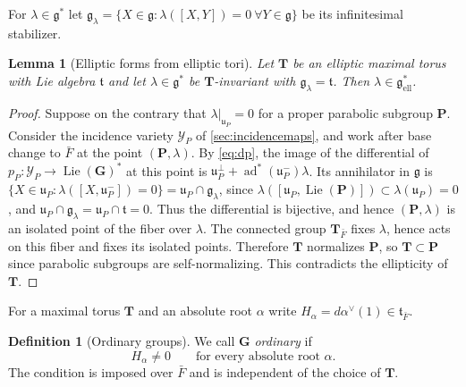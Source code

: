 \documentclass[11pt,reqno]{amsart}
\numberwithin{equation}{section}
\theoremstyle{plain}
\newtheorem{lemma}[theorem]{Lemma}
\theoremstyle{definition}
\newtheorem{definition}[theorem]{Definition}
\theoremstyle{remark}
\theoremstyle{plain}
\newcommand{\bG}{\mathbf{G}}     %
\newcommand{\bP}{\mathbf{P}}     %
\newcommand{\bT}{\mathbf{T}}     %
\newcommand{\g}{\mathfrak{g}}    %
\newcommand{\gd}{\mathfrak{g}^*} %
\newcommand{\uu}{\mathfrak{u}}   %
\newcommand{\liet}{\mathfrak{t}}  %
\newcommand{\Ell}[2][]{#2_{#1\mathrm{ell}}}   %
\DeclareMathOperator{\ad}{ad}
\DeclareMathOperator{\Lie}{Lie}
\newcommand{\ordinary}{ordinary}
\newcommand{\Ordinary}{Ordinary}
\newcommand{\lf}{\lambda}
\newcommand{\Inc}{\mathcal{Y}}
\newcommand{\bInc}{\boldsymbol{\Inc}}
\begin{document}
For $\lf\in\gd$ let $\g_\lf=\{X\in\g:\lf([X,Y])=0\ \forall Y\in\g\}$ be its infinitesimal stabilizer. 

\begin{lemma}[Elliptic forms from elliptic tori]\label{lem:toral}
Let $\bT$ be an elliptic maximal torus with Lie algebra $\liet$ and let
$\lf\in\gd$ be $\bT$-invariant with $\g_\lf=\liet$. Then $\lf\in\Ell{\gd}$.
\end{lemma}

\begin{proof}
Suppose on the contrary that $\lf|_{\uu_P}=0$ for a proper parabolic subgroup $\bP$.
Consider the incidence variety $\bInc_P$ of \cref{sec:incidencemaps},
and work after base change to $\bar F$
at the point $(\bP,\lf)$. By \eqref{eq:dp}, the
image of the differential of $p_P:\bInc_P\to\Lie(\bG)^*$ at this point is
$\uu_P^\perp+\ad^*(\uu_P^-)\lf$. Its annihilator in $\g$ is
$\{X\in\uu_P:\lf([X,\uu_P^-])=0\}=\uu_P\cap\g_\lf$, since
$\lf([\uu_P,\Lie(\bP)])\subset\lf(\uu_P)=0$, and
$\uu_P\cap\g_\lf=\uu_P\cap\liet=0$. Thus the differential is bijective, and hence $(\bP,\lf)$ is an
isolated point of the fiber over $\lf$. The connected group
$\bT_{\bar F}$ fixes $\lf$, hence acts on this fiber and fixes its
isolated points. Therefore $\bT$ normalizes $\bP$, so $\bT\subset\bP$
since parabolic subgroups are self-normalizing. This contradicts the ellipticity of $\bT$.
\end{proof}

For a maximal torus $\bT$ and an absolute root $\alpha$ write
$H_\alpha=d\alpha^\vee(1)\in\liet_{\bar F}$.

\begin{definition}[\Ordinary{} groups]\label{def:ordinary}
We call $\bG$ \emph{\ordinary{}} if
\begin{equation}\label{eq:corootcondition}
H_\alpha\ne0\qquad\text{for every absolute root }\alpha.
\end{equation}
The condition is imposed over $\bar F$ and is independent of the
choice of $\bT$.
\end{definition}
\end{document}
